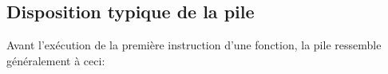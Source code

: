 \subsection{ Disposition typique de la pile }

Avant l'exécution de la première instruction d'une fonction, la pile ressemble généralement à ceci:


